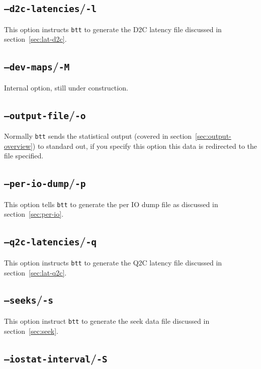 \documentclass{article}
\begin{document}
\subsection{\label{sec:o-l}\texttt{--d2c-latencies}/\texttt{-l}}

  This option instructs \texttt{btt} to generate the D2C latency file
  discussed in section~\ref{sec:lat-d2c}.

\subsection{\label{sec:o-M}\texttt{--dev-maps}/\texttt{-M}}

  Internal option, still under construction.

\subsection{\label{sec:o-o}\texttt{--output-file}/\texttt{-o}}

  Normally \texttt{btt} sends the statistical output (covered in
  section~\ref{sec:output-overview}) to standard out, if you specify
  this option this data is redirected to the file specified.

\subsection{\label{sec:o-p}\texttt{--per-io-dump}/\texttt{-p}}

  This option tells \texttt{btt} to generate the per IO dump file as
  discussed in section~\ref{sec:per-io}.

\subsection{\label{sec:o-q}\texttt{--q2c-latencies}/\texttt{-q}}

  This option instructs \texttt{btt} to generate the Q2C latency file
  discussed in section~\ref{sec:lat-q2c}.

\subsection{\label{sec:o-s}\texttt{--seeks}/\texttt{-s}}

  This option instruct \texttt{btt} to generate the seek data file
  discussed in section~\ref{sec:seek}.

\subsection{\label{sec:o-S}\texttt{--iostat-interval}/\texttt{-S}}
\end{document}
